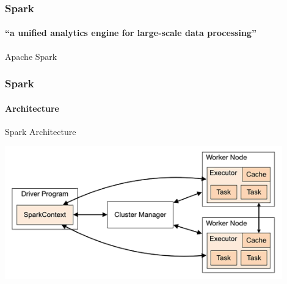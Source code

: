 \documentclass[aspectratio=169,dvipsnames]{beamer}
\begin{document}
    \begin{frame}
        \frametitle{Spark}
        \framesubtitle{``a unified analytics engine for large-scale data processing''}
        \vspace{-3ex}
        \begin{block}{Apache Spark}
        \begin{center}
        \end{center}
        \end{block}
    \end{frame}

        \begin{frame}
            \frametitle{Spark}
            \framesubtitle{Architecture}
        \vspace{-4ex}
            \begin{block}{Spark Architecture}
            \begin{center}
                \includegraphics[width=0.9\textwidth]{spark-architecture.png}
            \end{center}
            \end{block}

        \end{frame}
\end{document}
